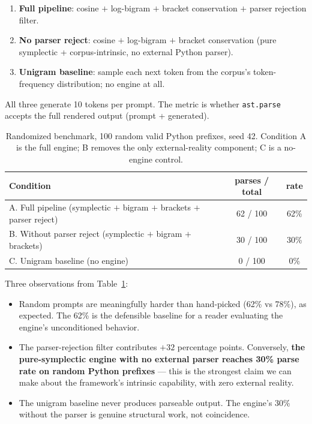 \documentclass[11pt,a4paper]{article}
\begin{document}
\begin{enumerate}[label=\textbf{\Alph*.}]
\item \textbf{Full pipeline}: cosine $+$ log-bigram $+$ bracket conservation $+$ parser rejection filter.
\item \textbf{No parser reject}: cosine $+$ log-bigram $+$ bracket conservation (pure symplectic + corpus-intrinsic, no external Python parser).
\item \textbf{Unigram baseline}: sample each next token from the corpus's token-frequency distribution; no engine at all.
\end{enumerate}

All three generate 10 tokens per prompt. The metric is whether \texttt{ast.parse} accepts the full rendered output (prompt + generated).

\begin{table}[ht]
\centering
\begin{tabular}{lcc}
\toprule
\textbf{Condition} & \textbf{parses / total} & \textbf{rate} \\
\midrule
A. Full pipeline (symplectic $+$ bigram $+$ brackets $+$ parser reject) & 62 / 100 & 62\% \\
B. Without parser reject (symplectic $+$ bigram $+$ brackets) & 30 / 100 & 30\% \\
C. Unigram baseline (no engine) & 0 / 100 & 0\% \\
\bottomrule
\end{tabular}
\caption{Randomized benchmark, 100 random valid Python prefixes, seed 42. Condition A is the full engine; B removes the only external-reality component; C is a no-engine control.}\label{tab:random_bench}
\end{table}

Three observations from Table~\ref{tab:random_bench}:

\begin{itemize}
\item Random prompts are meaningfully harder than hand-picked (62\% vs 78\%), as expected. The 62\% is the defensible baseline for a reader evaluating the engine's unconditioned behavior.
\item The parser-rejection filter contributes $+32$ percentage points. Conversely, \textbf{the pure-symplectic engine with no external parser reaches 30\% parse rate on random Python prefixes} — this is the strongest claim we can make about the framework's intrinsic capability, with zero external reality.
\item The unigram baseline never produces parseable output. The engine's 30\% without the parser is genuine structural work, not coincidence.
\end{itemize}
\end{document}
